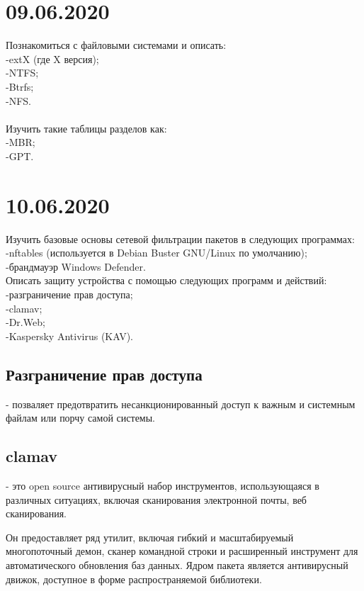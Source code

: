 \documentclass[a4paper,14pt]{extarticle}
\begin{document}
\section{09.06.2020}
Познакомиться с файловыми системами и описать:\\
        -extX (где X версия);\\
        -NTFS;\\
        -Btrfs;\\
        -NFS.\\ \\       
Изучить такие таблицы разделов как:\\
        -MBR;\\
        -GPT.\\
\newpage
\section{10.06.2020}
Изучить базовые основы сетевой фильтрации пакетов в следующих программах:\\
        -nftables (используется в Debian Buster GNU/Linux по умолчанию);\\
        -брандмауэр Windows Defender.\\

Описать защиту устройства с помощью следующих программ и действий:\\
        -разграничение прав доступа;\\
        -clamav;\\
        -Dr.Web;\\
        -Kaspersky Antivirus (KAV).\\
\subsection{Разграничение прав доступа}
- позваляет предотвратить несанкционированный доступ к важным и системным файлам или порчу самой системы.
\subsection{clamav}
- это open source антивирусный набор инструментов, использующаяся в различных ситуациях, включая сканирования электронной почты, веб сканирования.

Он предоставляет ряд утилит, включая гибкий и масштабируемый многопоточный демон, сканер командной строки и расширенный инструмент для автоматического обновления баз данных. Ядром пакета является антивирусный движок, доступное в форме распространяемой библиотеки.\cite{clamav}
\end{document}
